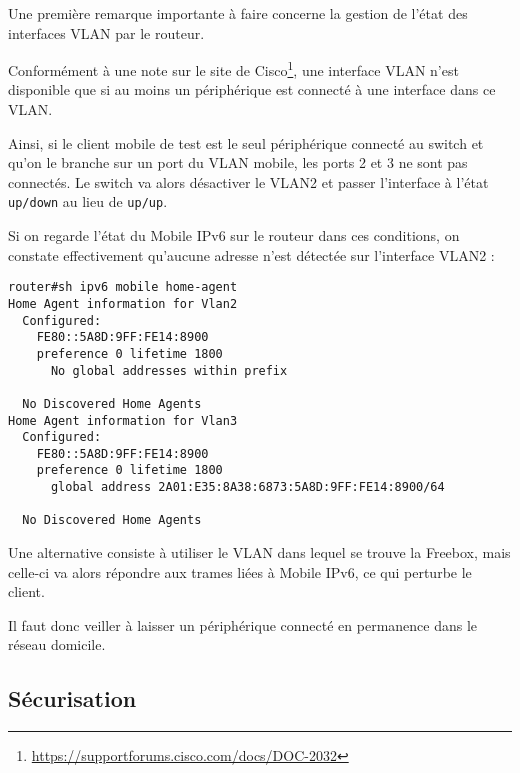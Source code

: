 \begin{warning}
Une première remarque importante à faire concerne la gestion de l'état des interfaces VLAN par le routeur.

Conformément à une note sur le site de Cisco\footnote{\url{https://supportforums.cisco.com/docs/DOC-2032}}, une interface VLAN n'est disponible que si au moins un périphérique est connecté à une interface dans ce VLAN.

Ainsi, si le client mobile de test est le seul périphérique connecté au switch et qu'on le branche sur un port du VLAN mobile, les ports 2 et 3 ne sont pas connectés.
Le switch va alors désactiver le VLAN2 et passer l'interface à l'état \texttt{up/down} au lieu de \texttt{up/up}.

Si on regarde l'état du Mobile IPv6 sur le routeur dans ces conditions, on constate effectivement qu'aucune adresse n'est détectée sur l'interface VLAN2 :
\begin{lstlisting}
router#sh ipv6 mobile home-agent
Home Agent information for Vlan2
  Configured:
    FE80::5A8D:9FF:FE14:8900
    preference 0 lifetime 1800
      No global addresses within prefix

  No Discovered Home Agents
Home Agent information for Vlan3
  Configured:
    FE80::5A8D:9FF:FE14:8900
    preference 0 lifetime 1800
      global address 2A01:E35:8A38:6873:5A8D:9FF:FE14:8900/64

  No Discovered Home Agents
\end{lstlisting}

Une alternative consiste à utiliser le VLAN dans lequel se trouve la Freebox, mais celle-ci va alors répondre aux trames liées à Mobile IPv6, ce qui perturbe le client.

Il faut donc veiller à laisser un périphérique connecté en permanence dans le réseau domicile.
\end{warning}


\subsection{Sécurisation}
